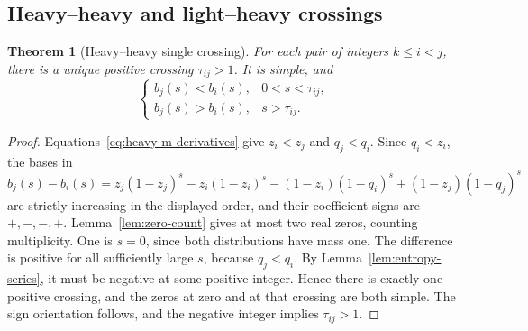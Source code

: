 \documentclass[11pt]{article}
\numberwithin{equation}{section}
\newtheorem{theorem}{Theorem}[section]
\begin{document}
\subsection{Heavy--heavy and light--heavy crossings}
\begin{theorem}[Heavy--heavy single crossing]\label{thm:heavy-crossing}
For each pair of integers $k\le i<j$, there is a unique positive crossing
$\tau_{ij}>1$. It is simple, and
\begin{equation}\label{eq:heavy-crossing-sign}
 \begin{cases}
 b_j(s)<b_i(s),&0<s<\tau_{ij},\\
 b_j(s)>b_i(s),&s>\tau_{ij}.
 \end{cases}
\end{equation}
\end{theorem}
\begin{proof}
Equations~\eqref{eq:heavy-m-derivatives} give $z_i<z_j$ and $q_j<q_i$.
Since $q_i<z_i$, the bases in
\[
 b_j(s)-b_i(s)
 =z_j(1-z_j)^s-z_i(1-z_i)^s
  -(1-z_i)(1-q_i)^s+(1-z_j)(1-q_j)^s
\]
are strictly increasing in the displayed order, and their coefficient
signs are $+,-,-,+$. Lemma~\ref{lem:zero-count} gives at most two real
zeros, counting multiplicity. One is $s=0$, since both distributions
have mass one. The difference is positive for all sufficiently large $s$,
because $q_j<q_i$. By Lemma~\ref{lem:entropy-series}, it must be negative
at some positive integer. Hence there is exactly one positive crossing,
and the zeros at zero and at that crossing are both simple. The sign
orientation follows, and the negative integer implies $\tau_{ij}>1$.
\end{proof}
\end{document}
